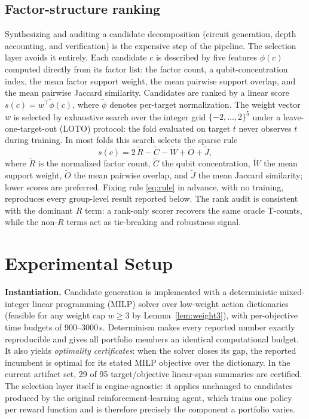 \documentclass{cbctq}
\begin{document}
\subsection{Factor-structure ranking}

Synthesizing and auditing a candidate decomposition (circuit generation, depth accounting, and verification) is the expensive step of the pipeline. The selection layer avoids it entirely. Each candidate $c$ is described by five features $\phi(c)$ computed directly from its factor list: the factor count, a qubit-concentration index, the mean factor support weight, the mean pairwise support overlap, and the mean pairwise Jaccard similarity. Candidates are ranked by a linear score $s(c) = w^\top \tilde\phi(c)$, where $\tilde\phi$ denotes per-target normalization. The weight vector $w$ is selected by exhaustive search over the integer grid $\{-2,\dots,2\}^5$ under a leave-one-target-out (LOTO) protocol: the fold evaluated on target $t$ never observes $t$ during training. In most folds this search selects the sparse rule
\begin{equation}
  s(c) = 2\,\widetilde{R} - \widetilde{C} - \widetilde{W} + \widetilde{O} + \widetilde{J},
  \label{eq:rule}
\end{equation}
where $\widetilde{R}$ is the normalized factor count, $\widetilde{C}$ the qubit concentration, $\widetilde{W}$ the mean support weight, $\widetilde{O}$ the mean pairwise overlap, and $\widetilde{J}$ the mean Jaccard similarity; lower scores are preferred. Fixing rule \eqref{eq:rule} in advance, with no training, reproduces every group-level result reported below. The rank audit is consistent with the dominant $R$ term: a rank-only scorer recovers the same oracle T-counts, while the non-$R$ terms act as tie-breaking and robustness signal.

\section{Experimental Setup}

\textbf{Instantiation.} Candidate generation is implemented with a deterministic mixed-integer linear programming (MILP) solver over low-weight action dictionaries (feasible for any weight cap $w\ge3$ by Lemma~\ref{lem:weight3}), with per-objective time budgets of 900--3000\,s. Determinism makes every reported number exactly reproducible and gives all portfolio members an identical computational budget. It also yields \emph{optimality certificates}: when the solver closes its gap, the reported incumbent is optimal for its stated MILP objective over the dictionary. In the current artifact set, 29 of 95 target/objective linear-span summaries are certified. The selection layer itself is engine-agnostic: it applies unchanged to candidates produced by the original reinforcement-learning agent, which trains one policy per reward function and is therefore precisely the component a portfolio varies.
\end{document}
